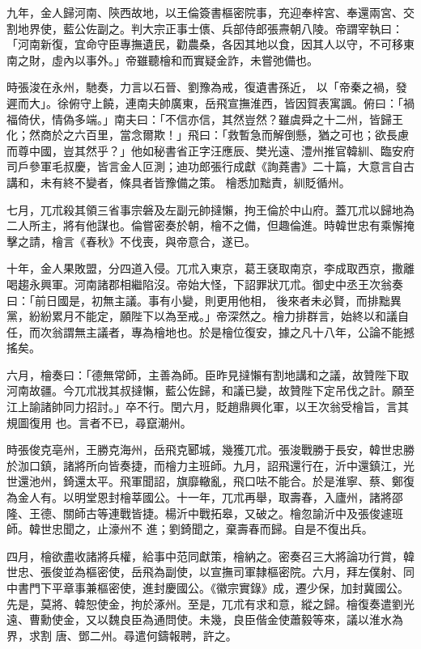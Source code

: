 \begin{pinyinscope}
 九年，金人歸河南、陝西故地，以王倫簽書樞密院事，充迎奉梓宮、奉還兩宮、交割地界使，藍公佐副之。判大宗正事士㒟、兵部侍郎張燾朝八陵。帝謂宰執曰：「河南新復，宜命守臣專撫遺民，勸農桑，各因其地以食，因其人以守，不可移東南之財，虛內以事外。」帝雖聽檜和而實疑金詐，未嘗弛備也。



 時張浚在永州，馳奏，力言以石晉、劉豫為戒，復遺書孫近，
 以「帝秦之禍，發遲而大」。徐俯守上饒，連南夫帥廣東，岳飛宣撫淮西，皆因賀表寓諷。俯曰：「禍福倚伏，情偽多端。」南夫曰：「不信亦信，其然豈然？雖虞舜之十二州，皆歸王化；然商於之六百里，當念爾欺！」飛曰：「救暫急而解倒懸，猶之可也；欲長慮而尊中國，豈其然乎？」他如秘書省正字汪應辰、樊光遠、澧州推官韓紃、臨安府司戶參軍毛叔慶，皆言金人叵測；迪功郎張行成獻《詢蕘書》二十篇，大意言自古講和，未有終不變者，條具者皆豫備之策。
 檜悉加黜責，紃貶循州。



 七月，兀朮殺其領三省事宗磐及左副元帥撻懶，拘王倫於中山府。蓋兀朮以歸地為二人所主，將有他謀也。倫嘗密奏於朝，檜不之備，但趣倫進。時韓世忠有乘懈掩擊之請，檜言《春秋》不伐喪，與帝意合，遂已。



 十年，金人果敗盟，分四道入侵。兀朮入東京，葛王褎取南京，李成取西京，撒離喝趨永興軍。河南諸郡相繼陷沒。帝始大怪，下詔罪狀兀朮。御史中丞王次翁奏曰：「前日國是，初無主議。事有小變，則更用他相，
 後來者未必賢，而排黜異黨，紛紛累月不能定，願陛下以為至戒。」帝深然之。檜力排群言，始終以和議自任，而次翁謂無主議者，專為檜地也。於是檜位復安，據之凡十八年，公論不能撼搖矣。



 六月，檜奏曰：「德無常師，主善為師。臣昨見撻懶有割地講和之議，故贊陛下取河南故疆。今兀朮戕其叔撻懶，藍公佐歸，和議已變，故贊陛下定吊伐之計。願至江上諭諸帥同力招討。」卒不行。閏六月，貶趙鼎興化軍，以王次翁受檜旨，言其規圖復用
 也。言者不已，尋竄潮州。



 時張俊克亳州，王勝克海州，岳飛克郾城，幾獲兀朮。張浚戰勝于長安，韓世忠勝於泇口鎮，諸將所向皆奏捷，而檜力主班師。九月，詔飛還行在，沂中還鎮江，光世還池州，錡還太平。飛軍聞詔，旗靡轍亂，飛口呿不能合。於是淮寧、蔡、鄭復為金人有。以明堂恩封檜莘國公。十一年，兀朮再舉，取壽春，入廬州，諸將邵隆、王德、關師古等連戰皆捷。楊沂中戰拓皋，又破之。檜忽諭沂中及張俊遽班師。韓世忠聞之，止濠州不
 進；劉錡聞之，棄壽春而歸。自是不復出兵。



 四月，檜欲盡收諸將兵權，給事中范同獻策，檜納之。密奏召三大將論功行賞，韓世忠、張俊並為樞密使，岳飛為副使，以宣撫司軍隸樞密院。六月，拜左僕射、同中書門下平章事兼樞密使，進封慶國公。《徽宗實錄》成，遷少保，加封冀國公。先是，莫將、韓恕使金，拘於涿州。至是，兀朮有求和意，縱之歸。檜復奏遣劉光遠、曹勳使金，又以魏良臣為通問使。未幾，良臣偕金使蕭毅等來，議以淮水為界，求割
 唐、鄧二州。尋遣何鑄報聘，許之。




\end{pinyinscope}
